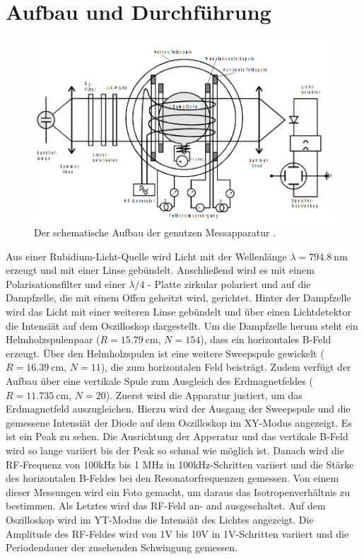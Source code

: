 \section{Aufbau und Durchführung}
\label{sec:Durchführung}

\begin{figure}
    \centering
    \includegraphics[width=\textwidth]{Fotos/aufbau.png}
    \caption{Der schematische Aufbau der genutzen Messapparatur \cite{V21}.}
    \label{fig:aufbau}
\end{figure}

Aus einer Rubidium-Licht-Quelle wird Licht 
mit der Wellenlänge $\lambda = \SI{794.8}{\nano \meter}$ erzeugt 
und mit einer Linse gebündelt.
Anschließend wird es mit einem Polarisationsfilter 
und einer $\lambda / 4$ - Platte zirkular polariert
und auf die Dampfzelle, die mit einem Offen geheitzt wird, gerichtet.
Hinter der Dampfzelle wird das Licht mit einer weiteren Linse gebündelt 
und über einen Lichtdetektor die Intensiät auf dem Oszilloskop dargestellt.
Um die Dampfzelle herum steht ein Helmholzspulenpaar ($R=\SI{15.79}{\cm}$, $N=154$), 
dass ein horizontales B-Feld erzeugt. 
Über den Helmholzspulen ist eine weitere Sweepspule gewickelt ($R=\SI{16.39}{\cm}$, $N=11$), 
die zum horizontalen Feld beisträgt.
Zudem verfügt der Aufbau über eine vertikale Spule zum Ausgleich des Erdmagnetfeldes ($R=\SI{11.735}{\cm}$, $N=20$).
\newline \newline
\noindent Zuerst wird die Apparatur justiert, um das Erdmagnetfeld auszugleichen. 
Hierzu wird der Ausgang der Sweepspule und die gemessene Intensiät der Diode 
auf dem Oszilloskop im XY-Modus angezeigt.
Es ist ein Peak zu sehen.
Die Ausrichtung der Apperatur und das vertikale B-Feld wird so lange variiert 
bis der Peak so schmal wie möglich ist.
\newline
\noindent Danach wird die RF-Frequenz von 100kHz bis 1 MHz in 100kHz-Schritten 
variiert und die Stärke des horizontalen B-Feldes bei den Resonatorfrequenzen gemessen.
Von einem dieser Messungen wird ein Foto gemacht, um daraus das Isotropenverhältnis zu bestimmen.
\newline
\noindent Als Letztes wird das RF-Feld an- and ausgeschaltet. 
Auf dem Oszilloskop wird im YT-Modus die Intensiät des Lichtes angezeigt.
Die Amplitude des RF-Feldes wird von 1V bis 10V in 1V-Schritten variiert 
und die Periodendauer der zusehenden Schwingung gemessen.


